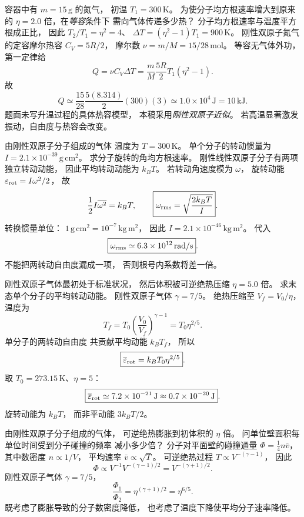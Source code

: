 容器中有 $m=15\,\mathrm g$ 的氮气，
初温 $T_1=300\,\mathrm K$。
为使分子均方根速率增大到原来的
$\eta=2.0$ 倍，在\emph{等容}条件下
需向气体传递多少热？
\exsolution
分子均方根速率与温度平方根成正比，
因此
$T_2/T_1=\eta^2=4$、
$\Delta T=(\eta^2-1)T_1=900\,\mathrm K$。
刚性双原子氮气的定容摩尔热容
$C_V=5R/2$，
摩尔数
$\nu=m/M=15/28\,\mathrm{mol}$。
等容无气体外功，第一定律给
\[
Q=\nu C_V\Delta T
=\frac mM\frac{5R}{2}T_1(\eta^2-1).
\]
故
\[
\boxed{Q\simeq
\frac{15}{28}\frac{5(8.314)}{2}(300)(3)
\simeq1.0\times10^4\,\mathrm J=10\,\mathrm{kJ}}.
\]
\excheck 题面未写升温过程的具体热容模型，
本稿采用\emph{刚性双原子近似}。
若高温显著激发振动，自由度与热容会改变。

由刚性双原子分子组成的气体
温度为 $T=300\,\mathrm K$。
单个分子的转动惯量为
$I=2.1\times10^{-39}\,\mathrm{g\,cm^2}$。
求分子旋转的角均方根速率。
\exsolution
刚性线性双原子分子有两项独立转动动能，
因此平均转动动能为 $k_BT$。
若转动角速度模为 $\omega$，
旋转动能 $\varepsilon_{\rm rot}=I\omega^2/2$，
故
\[
\frac12I\overline{\omega^2}=k_BT,\qquad
\boxed{\omega_{\rm rms}=\sqrt{\frac{2k_BT}{I}}}.
\]
转换惯量单位：
$1\,\mathrm{g\,cm^2}=10^{-7}\,\mathrm{kg\,m^2}$，
因此
$I=2.1\times10^{-46}\,\mathrm{kg\,m^2}$。
代入
\[
\boxed{\omega_{\rm rms}\simeq
6.3\times10^{12}\,\mathrm{rad/s}}.
\]
\excheck 不能把两转动自由度漏成一项，
否则根号内系数将差一倍。

刚性双原子气体最初处于标准状况，
然后体积被可逆绝热压缩
$\eta=5.0$ 倍。
求末态单个分子的平均转动动能。
\exsolution
刚性双原子气体
$\gamma=7/5$。
绝热压缩至 $V_f=V_0/\eta$，
温度为
\[
T_f=T_0\left(\frac{V_0}{V_f}\right)^{\gamma-1}
=T_0\eta^{2/5}.
\]
单分子的两转动自由度
共贡献平均动能 $k_BT_f$，
所以
\[
\boxed{\overline\varepsilon_{\rm rot}
=k_BT_0\eta^{2/5}}.
\]
取 $T_0=273.15\,\mathrm K$、$\eta=5$：
\[
\boxed{\overline\varepsilon_{\rm rot}
\simeq7.2\times10^{-21}\,\mathrm J
\approx0.7\times10^{-20}\,\mathrm J}.
\]
\excheck 旋转动能为 $k_BT$，
而非平动能 $3k_BT/2$。

由刚性双原子分子组成的气体，
可逆绝热膨胀到初体积的 $\eta$ 倍。
问单位壁面积每单位时间受到分子碰撞的频率
减小多少倍？
\exsolution
分子对平面壁的碰撞通量
$\Phi=\frac14 n\bar v$，
其中数密度 $n\propto1/V$，
平均速率 $\bar v\propto\sqrt T$。
可逆绝热过程
$T\propto V^{-(\gamma-1)}$，
因此
\[
\Phi\propto
V^{-1}V^{-(\gamma-1)/2}
=V^{-(\gamma+1)/2}.
\]
刚性双原子气体
$\gamma=7/5$，
\[
\boxed{\frac{\Phi_1}{\Phi_2}
=\eta^{(\gamma+1)/2}
=\eta^{6/5}}.
\]
\excheck 既考虑了膨胀导致的分子数密度降低，
也考虑了温度下降使平均分子速率降低。

